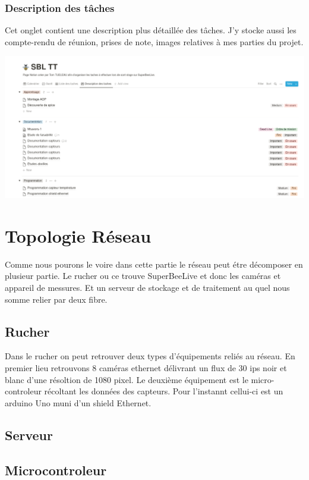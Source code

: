 \documentclass[11pt,french,a4paper]{article}
\begin{document}
\subsubsection{Description des tâches}
Cet onglet contient une description plus détaillée des tâches. J'y stocke aussi les compte-rendu de réunion, prises de note, images relatives à mes parties du projet.
\begin{center}	
\includegraphics[scale=0.35]{../img/notiondescriptiondestaches.png}
\label{Description des taches}
\end{center}

\newpage

\section{Topologie Réseau}
Comme nous pourons le voire dans cette partie le réseau peut étre décomposer en plusieur partie. Le rucher ou ce trouve SuperBeeLive et donc les caméras et appareil de messures. Et un serveur de stockage et de traitement au quel nous somme relier par deux fibre. 
\subsection{Rucher}
Dans le rucher on peut retrouver deux types d'équipements reliés au réseau. En premier lieu retrouvons 8 caméras ethernet délivrant un flux de 30 ips noir et blanc d'une résoltion de 1080 pixel. Le deuxième équipement est le micro-controleur récoltant les données des capteurs. Pour l'instannt cellui-ci est un arduino Uno muni d'un shield Ethernet. 
\subsection{Serveur}
\subsection{Microcontroleur}
\end{document}
